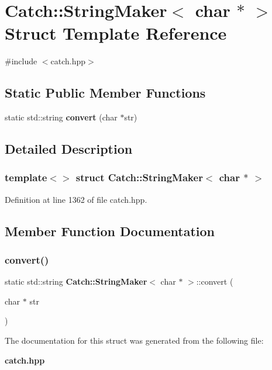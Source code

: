 \section{Catch\+::String\+Maker$<$ char $\ast$ $>$ Struct Template Reference}
\label{struct_catch_1_1_string_maker_3_01char_01_5_01_4}


{\ttfamily \#include $<$catch.\+hpp$>$}

\subsection*{Static Public Member Functions}
\begin{DoxyCompactItemize}
\item 
static std\+::string \textbf{ convert} (char $\ast$str)
\end{DoxyCompactItemize}


\subsection{Detailed Description}
\subsubsection*{template$<$$>$\newline
struct Catch\+::\+String\+Maker$<$ char $\ast$ $>$}



Definition at line 1362 of file catch.\+hpp.



\subsection{Member Function Documentation}
\mbox{\label{struct_catch_1_1_string_maker_3_01char_01_5_01_4_a33049e24281ea6fba48bd8817bdd52bd}} 
\subsubsection{convert()}
{\footnotesize\ttfamily static std\+::string \textbf{ Catch\+::\+String\+Maker}$<$ char $\ast$ $>$\+::convert (\begin{DoxyParamCaption}\item[{char $\ast$}]{str }\end{DoxyParamCaption})\hspace{0.3cm}{\ttfamily [static]}}



The documentation for this struct was generated from the following file\+:\begin{DoxyCompactItemize}
\item 
\textbf{ catch.\+hpp}\end{DoxyCompactItemize}
